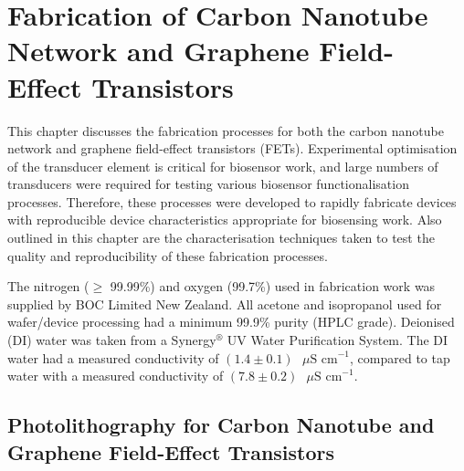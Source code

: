 \documentclass[
  letterpaper,
  DIV=11,
  numbers=noendperiod]{scrartcl}
\author{}
\date{}
\begin{document}
\ifdefined\Shaded\renewenvironment{Shaded}{\begin{tcolorbox}[sharp corners, frame hidden, enhanced, breakable, borderline west={3pt}{0pt}{shadecolor}, boxrule=0pt, interior hidden]}{\end{tcolorbox}}\fi

\hypertarget{sec-fabrication}{%
\section{Fabrication of Carbon Nanotube Network and Graphene
Field-Effect Transistors}\label{sec-fabrication}}

This chapter discusses the fabrication processes for both the carbon
nanotube network and graphene field-effect transistors (FETs).
Experimental optimisation of the transducer element is critical for
biosensor work, and large numbers of transducers were required for
testing various biosensor functionalisation processes. Therefore, these
processes were developed to rapidly fabricate devices with reproducible
device characteristics appropriate for biosensing work. Also outlined in
this chapter are the characterisation techniques taken to test the
quality and reproducibility of these fabrication processes.

The nitrogen (\(\geq\) 99.99\%) and oxygen (99.7\%) used in fabrication
work was supplied by BOC Limited New Zealand. All acetone and
isopropanol used for wafer/device processing had a minimum 99.9\% purity
(HPLC grade). Deionised (DI) water was taken from a
Synergy\(^\circledR\) UV Water Purification System. The DI water had a
measured conductivity of
\((1.4\pm0.1)\textrm{ } \mu \textrm{S cm}^{-1}\), compared to tap water
with a measured conductivity of
\((7.8\pm0.2)\textrm{ } \mu \textrm{S cm}^{-1}\).

\hypertarget{sec-photolithography}{%
\subsection{Photolithography for Carbon Nanotube and Graphene
Field-Effect Transistors}\label{sec-photolithography}}
\end{document}
